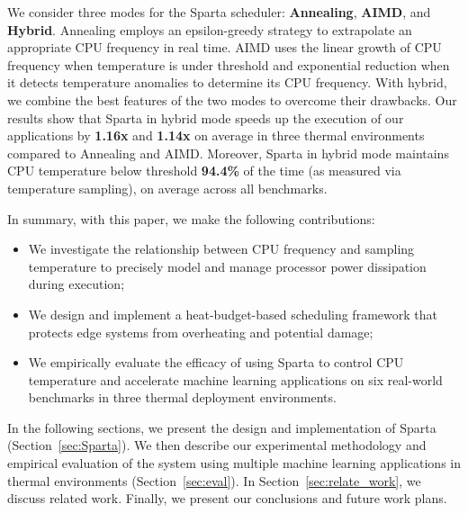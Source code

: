 We consider three modes for the Sparta scheduler: \textbf{Annealing}, \textbf{AIMD}, and \textbf{Hybrid}.  Annealing employs an epsilon-greedy strategy to extrapolate 
an appropriate CPU frequency in real time. 
AIMD uses the linear growth of CPU frequency when temperature is under threshold and 
exponential reduction when it detects temperature anomalies to determine its 
CPU frequency.  With hybrid, we combine the best features of the two modes to overcome their drawbacks. Our results show that Sparta in hybrid mode speeds up the execution of our applications by \textbf{1.16x} and \textbf{1.14x} on average in three thermal environments compared to Annealing and AIMD. Moreover, Sparta in hybrid mode maintains CPU
temperature below threshold \textbf{94.4\%} of the time (as measured via temperature
sampling), on average across all benchmarks. 

In summary, with this paper, we make the following contributions:
\begin{itemize}
    \item We investigate the relationship between CPU frequency and sampling temperature to precisely model and manage processor power dissipation during execution;
    \vspace{1mm}
    \item We design and implement a heat-budget-based scheduling framework that protects edge systems from overheating and potential damage;
    \vspace{1mm}
    \item We empirically evaluate the efficacy of using Sparta to control CPU temperature and accelerate machine learning applications on six real-world benchmarks in three thermal deployment environments. 
\end{itemize}
In the following sections, we present the design and implementation of Sparta (Section~\ref{sec:Sparta}). We then describe our experimental methodology and empirical evaluation of the system using multiple machine learning applications in thermal environments (Section~\ref{sec:eval}). In Section~\ref{sec:relate_work},  we discuss related work. Finally, we present our conclusions and future work plans.

